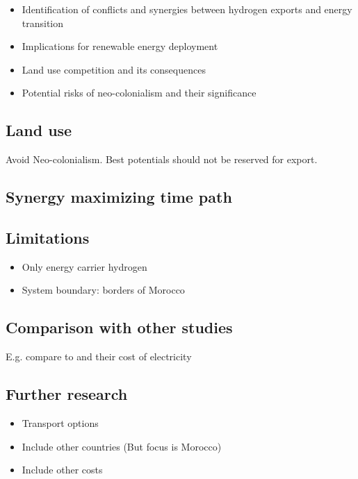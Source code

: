 \begin{itemize}
    \item Identification of conflicts and synergies between hydrogen exports and energy transition
    \item Implications for renewable energy deployment
    \item Land use competition and its consequences
    \item Potential risks of neo-colonialism and their significance
\end{itemize}


\subsection{Land use}
Avoid Neo-colonialism. Best potentials should not be reserved for export.

\subsection{Synergy maximizing time path}

\subsection{Limitations}
\label{subsec:limitations}
\begin{itemize}
    \item Only energy carrier hydrogen
    \item System boundary: borders of Morocco
\end{itemize}

\subsection{Comparison with other studies}
E.g. compare to \cite{Hampp2021} and their cost of electricity

\subsection{Further research}
\begin{itemize}
    \item Transport options
    \item Include other countries (But focus is Morocco)
    \item Include other costs
\end{itemize}